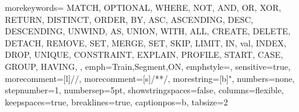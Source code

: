 {
	morekeywords={
		MATCH, OPTIONAL, WHERE, NOT, AND, OR, XOR, RETURN, DISTINCT, ORDER, BY, ASC, ASCENDING, DESC, DESCENDING, UNWIND, AS, UNION, WITH, ALL, CREATE, DELETE, DETACH, REMOVE, SET, MERGE, SET, SKIP, LIMIT, IN, val,
		INDEX, DROP, UNIQUE, CONSTRAINT, EXPLAIN, PROFILE, START, CASE,
		GROUP, HAVING,
	},
	emph={Train,Segment,ON},
	emphstyle={\color{emphColor}},
	sensitive=true,
	morecomment=[l]{//},
	morecomment=[s]{/*}{*/},
	morestring=[b]{"},
	numbers=none,
	stepnumber=1,
	numbersep=5pt,
	showstringspaces=false,
	columns=flexible,
	keepspaces=true,
	breaklines=true,	
	captionpos=b,
	tabsize=2
}
\newcommand{\cypherStyle}[1]{\lstinline[style=cypherbig]@#1@}


